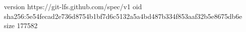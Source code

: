 version https://git-lfs.github.com/spec/v1
oid sha256:5e54fecad2e736d8754b1bf7d6c5132a5a4bd487b334f853aaf32b5e8675db6e
size 177582
